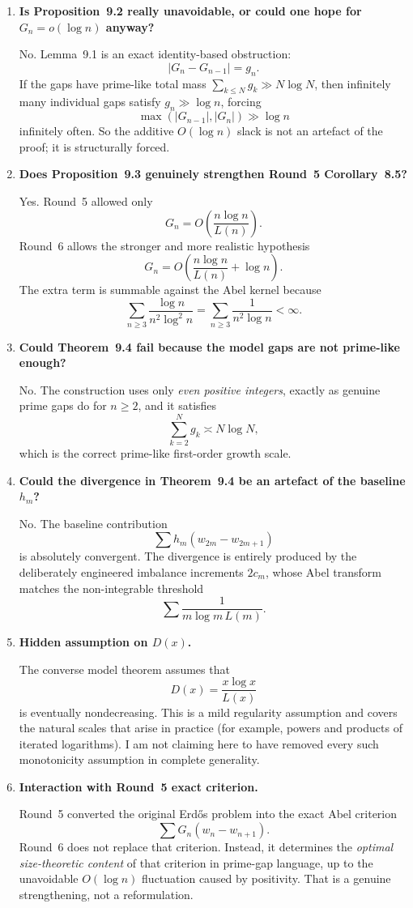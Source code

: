 \begin{enumerate}
\item \textbf{Is Proposition~9.2 really unavoidable, or could one hope for \(G_n=o(\log n)\) anyway?}

No.
Lemma~9.1 is an exact identity-based obstruction:
\[
|G_n-G_{n-1}|=g_n.
\]
If the gaps have prime-like total mass \(\sum_{k\le N} g_k\gg N\log N\), then infinitely many individual gaps satisfy \(g_n\gg \log n\), forcing
\[
\max(|G_{n-1}|,|G_n|)\gg \log n
\]
infinitely often.
So the additive \(O(\log n)\) slack is not an artefact of the proof; it is structurally forced.

\item \textbf{Does Proposition~9.3 genuinely strengthen Round~5 Corollary~8.5?}

Yes.
Round~5 allowed only
\[
G_n=O\!\left(\frac{n\log n}{L(n)}\right).
\]
Round~6 allows the stronger and more realistic hypothesis
\[
G_n=O\!\left(\frac{n\log n}{L(n)}+\log n\right).
\]
The extra term is summable against the Abel kernel because
\[
\sum_{n\ge 3}\frac{\log n}{n^2\log^2 n}
=
\sum_{n\ge 3}\frac{1}{n^2\log n}
<\infty.
\]

\item \textbf{Could Theorem~9.4 fail because the model gaps are not prime-like enough?}

No.
The construction uses only \emph{even positive integers}, exactly as genuine prime gaps do for \(n\ge 2\), and it satisfies
\[
\sum_{k=2}^N g_k\asymp N\log N,
\]
which is the correct prime-like first-order growth scale.

\item \textbf{Could the divergence in Theorem~9.4 be an artefact of the baseline \(h_m\)?}

No.
The baseline contribution
\[
\sum h_m(w_{2m}-w_{2m+1})
\]
is absolutely convergent.
The divergence is entirely produced by the deliberately engineered imbalance increments \(2c_m\), whose Abel transform matches the non-integrable threshold
\[
\sum \frac{1}{m\log m\,L(m)}.
\]

\item \textbf{Hidden assumption on \(D(x)\).}

The converse model theorem assumes that
\[
D(x)=\frac{x\log x}{L(x)}
\]
is eventually nondecreasing.
This is a mild regularity assumption and covers the natural scales that arise in practice (for example, powers and products of iterated logarithms).
I am not claiming here to have removed every such monotonicity assumption in complete generality.

\item \textbf{Interaction with Round~5 exact criterion.}

Round~5 converted the original Erd\H{o}s problem into the exact Abel criterion
\[
\sum G_n(w_n-w_{n+1}).
\]
Round~6 does not replace that criterion.
Instead, it determines the \emph{optimal size-theoretic content} of that criterion in prime-gap language, up to the unavoidable \(O(\log n)\) fluctuation caused by positivity.
That is a genuine strengthening, not a reformulation.
\end{enumerate}

